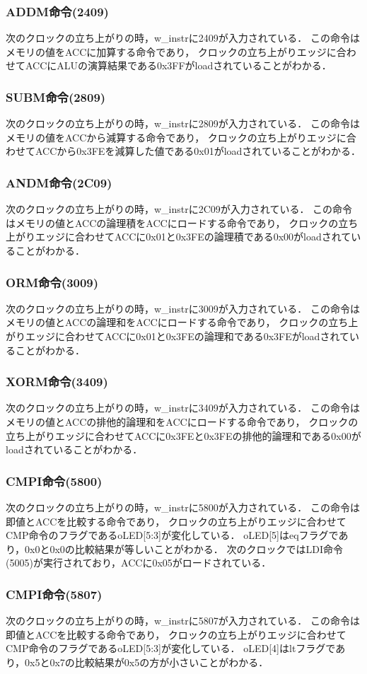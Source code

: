 \documentclass[a4paper,11pt]{ltjsarticle}
\begin{document}
\subsubsection{ADDM命令(2409)}
次のクロックの立ち上がりの時，w\_instrに2409が入力されている．
この命令はメモリの値をACCに加算する命令であり，
クロックの立ち上がりエッジに合わせてACCにALUの演算結果である0x3FFがloadされていることがわかる．
\subsubsection{SUBM命令(2809)}
次のクロックの立ち上がりの時，w\_instrに2809が入力されている．
この命令はメモリの値をACCから減算する命令であり，
クロックの立ち上がりエッジに合わせてACCから0x3FEを減算した値である0x01がloadされていることがわかる．
\subsubsection{ANDM命令(2C09)}
次のクロックの立ち上がりの時，w\_instrに2C09が入力されている．
この命令はメモリの値とACCの論理積をACCにロードする命令であり，
クロックの立ち上がりエッジに合わせてACCに0x01と0x3FEの論理積である0x00がloadされていることがわかる．
\subsubsection{ORM命令(3009)}
次のクロックの立ち上がりの時，w\_instrに3009が入力されている．
この命令はメモリの値とACCの論理和をACCにロードする命令であり，
クロックの立ち上がりエッジに合わせてACCに0x01と0x3FEの論理和である0x3FEがloadされていることがわかる．
\subsubsection{XORM命令(3409)}
次のクロックの立ち上がりの時，w\_instrに3409が入力されている．
この命令はメモリの値とACCの排他的論理和をACCにロードする命令であり，
クロックの立ち上がりエッジに合わせてACCに0x3FEと0x3FEの排他的論理和である0x00がloadされていることがわかる．
\subsubsection{CMPI命令(5800)}
次のクロックの立ち上がりの時，w\_instrに5800が入力されている．
この命令は即値とACCを比較する命令であり，
クロックの立ち上がりエッジに合わせてCMP命令のフラグであるoLED[5:3]が変化している．
oLED[5]はeqフラグであり，0x0と0x0の比較結果が等しいことがわかる．
次のクロックではLDI命令(5005)が実行されており，ACCに0x05がロードされている．
\subsubsection{CMPI命令(5807)}
次のクロックの立ち上がりの時，w\_instrに5807が入力されている．
この命令は即値とACCを比較する命令であり，
クロックの立ち上がりエッジに合わせてCMP命令のフラグであるoLED[5:3]が変化している．
oLED[4]はltフラグであり，0x5と0x7の比較結果が0x5の方が小さいことがわかる．
\end{document}
